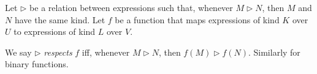 {\begin{code}
%
\\
\> \AgdaSymbol{:}  \AgdaSymbol{\{}\AgdaSymbol{\}} \AgdaSymbol{\{}\AgdaSymbol{\}} \AgdaSymbol{\{}\AgdaSymbol{\}} \AgdaSymbol{\{} \AgdaSymbol{:}  \AgdaSymbol{(}  \AgdaSymbol{)\}} \AgdaSymbol{\{}  \AgdaSymbol{:}   \AgdaSymbol{\}}            \<%
\\
\> \AgdaSymbol{(} \AgdaSymbol{)} \AgdaSymbol{=}  \AgdaSymbol{(} \AgdaSymbol{)}\<%
\\
\>  \AgdaSymbol{=} \<%
\\
\> \AgdaSymbol{(} \AgdaSymbol{)} \AgdaSymbol{=}  \AgdaSymbol{(} \AgdaSymbol{)}\<%
\\
\> \AgdaSymbol{(}  \AgdaSymbol{)} \AgdaSymbol{=}  \AgdaSymbol{(} \AgdaSymbol{)} \AgdaSymbol{(} \AgdaSymbol{)}\<%
\end{code}
}

\begin{definition}
Let $\rhd$ be a relation between expressions such that, whenever $M \rhd N$, then $M$ and $N$ have the same kind.  Let $f$ be a function that maps expressions of kind $K$ over $U$ to expressions of kind $L$ over $V$.

We say $\rhd$ \emph{respects} $f$ iff, whenever $M \rhd N$, then $f(M) \rhd f(N)$.  Similarly for binary functions.
\end{definition}


